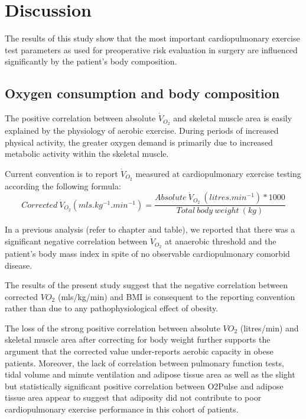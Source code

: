 


\clearpage

\section{Discussion}

The results of this study show that the most important cardiopulmonary exercise test parameters as used for preoperative risk evaluation in surgery are influenced significantly by the patient's body composition. 

\subsection{Oxygen consumption and body composition}

The positive correlation between absolute $\dot{V}_{O_2}$ and skeletal muscle area is easily explained by the physiology of aerobic exercise. During periods of increased physical activity, the greater oxygen demand is primarily due to increased metabolic activity within the skeletal muscle. 

Current convention is to report $\dot{V}_{O_2}$ measured at cardiopulmonary exercise testing according the following formula: 
\[Corrected\ \dot{V}_{O_2} (mls.kg^{-1}.min^{-1}) = \frac{Absolute\ \dot{V}_{O_2}\ (litres.min^{-1}) * 1000}{Total\ body\ weight\ (kg)}\]

In a previous analysis (refer to chapter and table), we reported that there was a significant negative correlation between $\dot{V}_{O_2}$ at anaerobic threshold and the patient's body mass index in spite of no observable cardiopulmonary comorbid disease. 

The results of the present study suggest that the negative correlation between corrected $VO_{2}$ (mls/kg/min) and BMI is consequent to the reporting convention rather than due to any pathophysiological effect of obesity. 

The loss of the strong positive correlation between absolute $VO_{2}$ (litres/min) and skeletal muscle area after correcting for body weight further supports the argument that the corrected value under-reports aerobic capacity in obese patients. Moreover, the lack of correlation between pulmonary function tests, tidal volume and minute ventilation and adipose tissue area as well as the slight but statistically significant positive correlation between O2Pulse and adipose tissue area appear to suggest that adiposity did not contribute to poor cardiopulmonary exercise performance in this cohort of patients.


